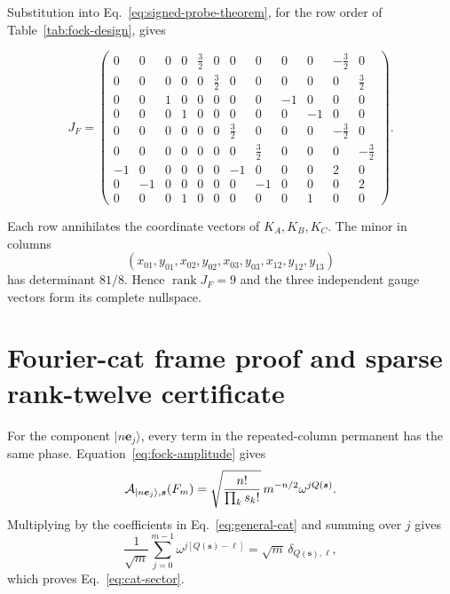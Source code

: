 \documentclass[aps,pra,reprint,amsmath,amssymb,superscriptaddress,longbibliography]{revtex4-2}
\newcommand{\be}{\bm e}
\begin{document}
Substitution into Eq.~\eqref{eq:signed-probe-theorem}, for the row order of
Table~\ref{tab:fock-design}, gives
\begin{widetext}
\begin{equation}
J_F=
\begin{pmatrix}
0&0&0&0&\frac32&0&0&0&0&0&-\frac32&0\\
0&0&0&0&0&\frac32&0&0&0&0&0&\frac32\\
0&0&1&0&0&0&0&0&-1&0&0&0\\
0&0&0&1&0&0&0&0&0&-1&0&0\\
0&0&0&0&0&0&\frac32&0&0&0&-\frac32&0\\
0&0&0&0&0&0&0&\frac32&0&0&0&-\frac32\\
-1&0&0&0&0&0&-1&0&0&0&2&0\\
0&-1&0&0&0&0&0&-1&0&0&0&2\\
0&0&0&1&0&0&0&0&0&1&0&0
\end{pmatrix}.
\label{eq:fock-jacobian}
\end{equation}
\end{widetext}
Each row annihilates the coordinate vectors of $K_A,K_B,K_C$.
The minor in columns
\begin{equation}
(x_{01},y_{01},x_{02},y_{02},x_{03},y_{03},x_{12},y_{12},y_{13})
\end{equation}
has determinant $81/8$.  Hence $\operatorname{rank}J_F=9$ and the three
independent gauge vectors form its complete nullspace.

\section{Fourier-cat frame proof and sparse rank-twelve certificate}
\label{app:cat-certificate}

For the component $|n\be_j\rangle$, every term in the repeated-column
permanent has the same phase.  Equation~\eqref{eq:fock-amplitude} gives
\begin{equation}
 {\cal A}_{|n\be_j\rangle,\bm s}(F_m)
 =\sqrt{\frac{n!}{\prod_ks_k!}}\,
 m^{-n/2}\omega^{jQ(\bm s)} .
\end{equation}
Multiplying by the coefficients in Eq.~\eqref{eq:general-cat} and summing
over $j$ gives
\begin{equation}
 \frac1{\sqrt m}\sum_{j=0}^{m-1}
 \omega^{j[Q(\bm s)-\ell]}
 =\sqrt m\,\delta_{Q(\bm s),\ell},
\end{equation}
which proves Eq.~\eqref{eq:cat-sector}.
\end{document}

